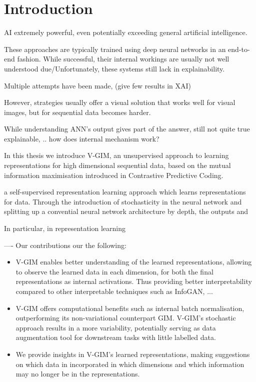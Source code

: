 \chapter{Introduction}

\setcounter{page}{1} %


AI extremely powerful, even potentially exceeding general artificial intelligence.

These approaches are typically trained using deep neural networks in an end-to-end fashion. While successful, their internal workings are usually not well understood due/Unfortunately, these systems still lack in explainability.

Multiple attempts have been made, (give few results in XAI)

However, strategies usually offer a visual solution that works well for visual images, but for sequential data becomes harder.

While understanding ANN's output gives part of the answer, still not quite true explainable, .. how does internal mechanism work?
 

In this thesis we introduce V-GIM, an unsupervised approach to learning representations for high dimensional sequential data, based on the mutual information maximisation introduced in Contrastive Predictive Coding.

a self-supervised representation learning approach which learns representations for data. Through the introduction of stochasticity in the neural network and splitting up a convential neural network architecture by depth, the outputs and 

In particular, in representation learning 

----
Our contributions our the following:
\begin{itemize}
	\item V-GIM enables better understanding of the learned representations, allowing to observe the learned data in each dimension, for both the final representations as internal activations. Thus providing better interpretability compared to other interpretable techniques such as InfoGAN, ...
	\item V-GIM offers computational benefits such as internal batch normalisation, outperforming its non-variational counterpart GIM. V-GIM's stochastic approach results in a more variability, potentially serving as data augmentation tool for downstream tasks with little labelled data.
	\item We provide insights in V-GIM's learned representations, making suggestions on which data in incorporated in which dimensions and which information may no longer be in the representations.
\end{itemize}




